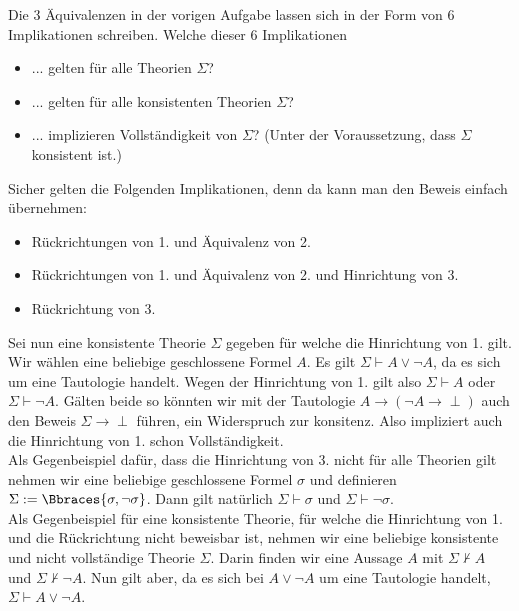 
\begin{exercise}[114]

Die 3 Äquivalenzen in der vorigen Aufgabe lassen sich in der Form von 6
Implikationen schreiben. Welche dieser 6 Implikationen
\begin{itemize}
  \item ... gelten für alle Theorien $\Sigma$?
  \item ... gelten für alle konsistenten Theorien $\Sigma$?
  \item ... implizieren Vollständigkeit von $\Sigma$? (Unter der Voraussetzung,
  dass $\Sigma$ konsistent ist.)
\end{itemize}
\end{exercise}


\begin{solution}

Sicher gelten die Folgenden Implikationen, denn da kann man den Beweis einfach übernehmen:
\begin{itemize}
  \item Rückrichtungen von 1. und Äquivalenz von 2. 
  \item Rückrichtungen von 1. und Äquivalenz von 2. und Hinrichtung von 3.
  \item Rückrichtung von 3.
\end{itemize}
Sei nun eine konsistente Theorie $\Sigma$ gegeben für welche die Hinrichtung von 1. gilt. Wir wählen eine beliebige geschlossene Formel $A$. Es gilt $\Sigma \vdash A \lor \neg A$, da es sich um eine Tautologie handelt. Wegen der Hinrichtung von 1. gilt also $\Sigma \vdash A$ oder $\Sigma \vdash \neg A$. Gälten beide so könnten wir mit der Tautologie $A \rightarrow (\neg A \rightarrow \perp)$ auch den Beweis $\Sigma \rightarrow \perp$ führen, ein Widerspruch zur konsitenz. Also impliziert auch die Hinrichtung von 1. schon Vollständigkeit. \\
Als Gegenbeispiel dafür, dass die Hinrichtung von 3. nicht für alle Theorien gilt nehmen wir eine beliebige geschlossene Formel $\sigma$ und definieren $\Sigma := \Bbraces{\sigma, \neg \sigma}$. Dann gilt natürlich $\Sigma \vdash \sigma$ und $\Sigma \vdash \neg \sigma$. \\
Als Gegenbeispiel für eine konsistente Theorie, für welche die Hinrichtung von 1. und die Rückrichtung nicht beweisbar ist, nehmen wir eine beliebige konsistente und nicht vollständige Theorie $\Sigma$. Darin finden wir eine Aussage $A$ mit $\Sigma \nvdash A$ und $\Sigma \nvdash \neg A$. Nun gilt aber, da es sich bei $A \lor \neg A$ um eine Tautologie handelt, $\Sigma \vdash A \lor \neg A$. 

\end{solution}

